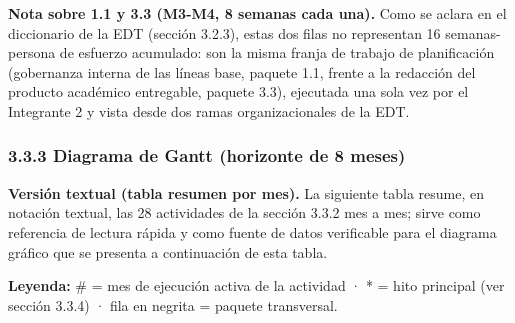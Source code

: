 \documentclass[11pt,a4paper]{article}
\begin{document}
\textbf{Nota sobre 1.1 y 3.3 (M3-M4, 8 semanas cada una).} Como se aclara en el diccionario de la EDT (sección 3.2.3), estas dos filas no representan 16 semanas-persona de esfuerzo acumulado: son la misma franja de trabajo de planificación (gobernanza interna de las líneas base, paquete 1.1, frente a la redacción del producto académico entregable, paquete 3.3), ejecutada una sola vez por el Integrante 2 y vista desde dos ramas organizacionales de la EDT.

\subsubsection{3.3.3 Diagrama de Gantt (horizonte de 8 meses)}\label{diagrama-de-gantt-horizonte-de-8-meses}

\textbf{Versión textual (tabla resumen por mes).} La siguiente tabla resume, en notación textual, las 28 actividades de la sección 3.3.2 mes a mes; sirve como referencia de lectura rápida y como fuente de datos verificable para el diagrama gráfico que se presenta a continuación de esta tabla.

\textbf{Leyenda:} \# = mes de ejecución activa de la actividad · * = hito principal (ver sección 3.3.4) · fila en negrita = paquete transversal.
\end{document}
